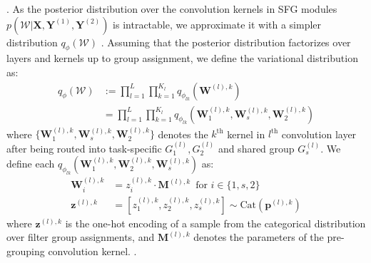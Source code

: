 . As the posterior distribution over the convolution kernels in SFG modules $p(\mathcal{W}|\textbf{X}, \mathbf{Y}^{(1)}, \mathbf{Y}^{(2)})$ is intractable, we approximate it with a simpler distribution $q_{\phi}(\mathcal{W})$ . Assuming that the posterior distribution factorizes over layers and kernels up to group assignment, we define the variational distribution as:
\begin{align*}
q_{\phi}(\mathcal{W}) &:= \prod_{l=1}^{L}\prod_{k=1}^{K_{l}} q_{\phi_{lk}}(\mathbf{W}^{(l),k}) \\
&= \prod_{l=1}^{L}\prod_{k=1}^{K_{l}} q_{\phi_{lk}}(\mathbf{W}^{(l),k}_1,\mathbf{W}^{(l),k}_{s}, \mathbf{W}^{(l),k}_{2})
\end{align*}
where $\{\mathbf{W}^{(l),k}_1,\mathbf{W}^{(l),k}_{s}, \mathbf{W}^{(l),k}_{2}\}$ denotes the $k^{\text{th}}$ kernel in $l^{\text{th}}$ convolution layer after being routed into task-specific $G^{(l)}_1, G^{(l)}_2$ and shared group $G^{(l)}_{s}$. We define each $q_{\phi_{lk}}(\mathbf{W}^{(l),k}_1,\mathbf{W}^{(l),k}_2, \mathbf{W}^{(l),k}_{s})$ as: 
\begin{align}
\mathbf{W}^{(l),k}_{i} &= z^{(l),k}_{i}\cdot\mathbf{M}^{(l),k}\, \,\,\text{for } i \in\{1,s,2\}\\
\mathbf{z}^{(l),k}&=[z^{(l),k}_{1}, z^{(l),k}_{2},  z^{(l),k}_{s}] \sim \text{Cat}(\mathbf{p}^{(l),k}) \label{eq:sample_cat}
\end{align}
where $\mathbf{z}^{(l),k}$ is the one-hot encoding of a sample from the categorical distribution over filter group assignments, and $\mathbf{M}^{(l),k}$ denotes the parameters of the pre-grouping convolution kernel. . 

